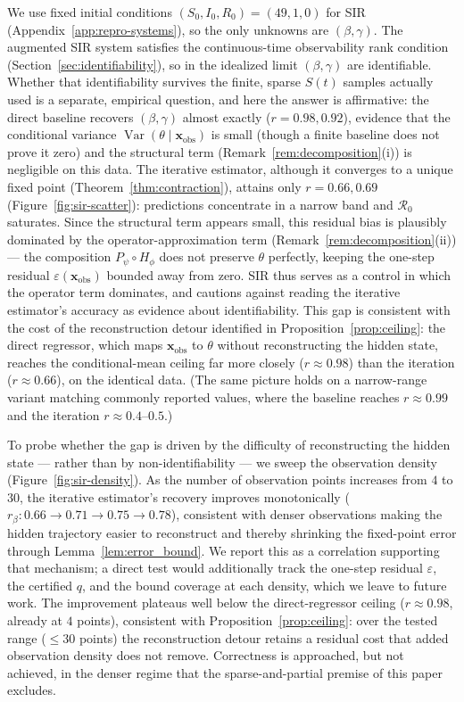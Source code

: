 We use fixed initial conditions $(S_0,I_0,R_0)=(49,1,0)$ for SIR (Appendix~\ref{app:repro-systems}), so the
only unknowns are $(\beta,\gamma)$. The augmented SIR system satisfies the continuous-time observability
rank condition (Section~\ref{sec:identifiability}), so in the idealized limit $(\beta,\gamma)$ are
identifiable. Whether that identifiability survives the finite, sparse $S(t)$ samples actually used is a
separate, empirical question, and here the answer is affirmative: the direct baseline recovers
$(\beta,\gamma)$ almost exactly ($r=0.98,0.92$), evidence that the conditional variance
$\operatorname{Var}(\theta\mid\mathbf{x}_\mathrm{obs})$ is small (though a finite baseline does not prove it
zero) and the structural term (Remark~\ref{rem:decomposition}(i)) is negligible on this data. The iterative
estimator, although it converges to a unique fixed point (Theorem~\ref{thm:contraction}), attains only
$r=0.66,0.69$ (Figure~\ref{fig:sir-scatter}): predictions concentrate in a narrow band and
$\mathcal{R}_0$ saturates. Since the structural term appears small, this residual bias is plausibly
dominated by the operator-approximation term (Remark~\ref{rem:decomposition}(ii)) --- the composition
$P_\psi\!\circ\!H_\phi$ does not preserve $\theta$ perfectly, keeping the one-step residual
$\varepsilon(\mathbf{x}_\mathrm{obs})$ bounded away from zero. SIR thus serves as a control in which the
operator term dominates, and cautions against reading the
iterative estimator's accuracy as evidence about identifiability. This gap is consistent with the cost of
the reconstruction detour identified in Proposition~\ref{prop:ceiling}: the direct regressor, which maps
$\mathbf{x}_\mathrm{obs}$ to $\theta$ without reconstructing the hidden state, reaches the
conditional-mean ceiling far more closely ($r\approx0.98$) than the iteration ($r\approx0.66$), on the
identical data. (The same picture holds on a narrow-range variant matching commonly reported values,
where the baseline reaches $r\approx0.99$ and the iteration $r\approx0.4$--$0.5$.)

To probe whether the gap is driven by the difficulty of reconstructing the hidden state --- rather than by
non-identifiability --- we sweep the observation density (Figure~\ref{fig:sir-density}). As the number
of observation points increases from $4$ to $30$, the iterative estimator's recovery improves
monotonically ($r_\beta: 0.66\!\to\!0.71\!\to\!0.75\!\to\!0.78$), consistent with denser observations
making the hidden trajectory easier to reconstruct and thereby shrinking the fixed-point error through
Lemma~\ref{lem:error_bound}. We report this as a correlation supporting that mechanism; a direct test
would additionally track the one-step residual $\varepsilon$, the certified $q$, and the bound coverage at
each density, which we leave to future work. The improvement plateaus well below the direct-regressor
ceiling ($r\approx0.98$, already at $4$ points), consistent with Proposition~\ref{prop:ceiling}: over the
tested range ($\le30$ points) the reconstruction detour retains a residual cost that added observation
density does not remove. Correctness is approached, but not achieved, in the denser regime that the
sparse-and-partial premise of this paper excludes.

